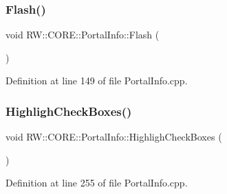 \hypertarget{class_r_w_1_1_c_o_r_e_1_1_portal_info_af72c1360fe61113175d39791b18312e1}{}\label{class_r_w_1_1_c_o_r_e_1_1_portal_info_af72c1360fe61113175d39791b18312e1} 
\subsubsection{\texorpdfstring{Flash()}{Flash()}}
{\footnotesize\ttfamily void R\+W\+::\+C\+O\+R\+E\+::\+Portal\+Info\+::\+Flash (\begin{DoxyParamCaption}{ }\end{DoxyParamCaption})\hspace{0.3cm}{\ttfamily [private]}}



Definition at line 149 of file Portal\+Info.\+cpp.

\hypertarget{class_r_w_1_1_c_o_r_e_1_1_portal_info_aeb0d50467997e59088be9f5b952916f7}{}\label{class_r_w_1_1_c_o_r_e_1_1_portal_info_aeb0d50467997e59088be9f5b952916f7} 
\subsubsection{\texorpdfstring{Highligh\+Check\+Boxes()}{HighlighCheckBoxes()}}
{\footnotesize\ttfamily void R\+W\+::\+C\+O\+R\+E\+::\+Portal\+Info\+::\+Highligh\+Check\+Boxes (\begin{DoxyParamCaption}{ }\end{DoxyParamCaption})\hspace{0.3cm}{\ttfamily [private]}}



Definition at line 255 of file Portal\+Info.\+cpp.

\hypertarget{class_r_w_1_1_c_o_r_e_1_1_portal_info_a9f104d772b07f236cb0f8e0c0c46461c}{}\label{class_r_w_1_1_c_o_r_e_1_1_portal_info_a9f104d772b07f236cb0f8e0c0c46461c} 
